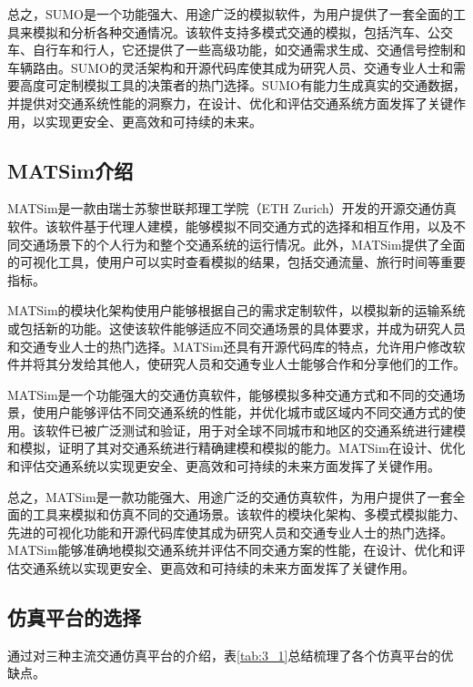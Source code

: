 总之，SUMO是一个功能强大、用途广泛的模拟软件，为用户提供了一套全面的工具来模拟和分析各种交通情况。该软件支持多模式交通的模拟，包括汽车、公交车、自行车和行人，它还提供了一些高级功能，如交通需求生成、交通信号控制和车辆路由。SUMO的灵活架构和开源代码库使其成为研究人员、交通专业人士和需要高度可定制模拟工具的决策者的热门选择。SUMO有能力生成真实的交通数据，并提供对交通系统性能的洞察力，在设计、优化和评估交通系统方面发挥了关键作用，以实现更安全、更高效和可持续的未来。

\subsection{MATSim介绍}

MATSim是一款由瑞士苏黎世联邦理工学院（ETH Zurich）开发的开源交通仿真软件。该软件基于代理人建模，能够模拟不同交通方式的选择和相互作用，以及不同交通场景下的个人行为和整个交通系统的运行情况。此外，MATSim提供了全面的可视化工具，使用户可以实时查看模拟的结果，包括交通流量、旅行时间等重要指标。

MATSim的模块化架构使用户能够根据自己的需求定制软件，以模拟新的运输系统或包括新的功能。这使该软件能够适应不同交通场景的具体要求，并成为研究人员和交通专业人士的热门选择。MATSim还具有开源代码库的特点，允许用户修改软件并将其分发给其他人，使研究人员和交通专业人士能够合作和分享他们的工作。

MATSim是一个功能强大的交通仿真软件，能够模拟多种交通方式和不同的交通场景，使用户能够评估不同交通系统的性能，并优化城市或区域内不同交通方式的使用。该软件已被广泛测试和验证，用于对全球不同城市和地区的交通系统进行建模和模拟，证明了其对交通系统进行精确建模和模拟的能力。MATSim在设计、优化和评估交通系统以实现更安全、更高效和可持续的未来方面发挥了关键作用。

总之，MATSim是一款功能强大、用途广泛的交通仿真软件，为用户提供了一套全面的工具来模拟和仿真不同的交通场景。该软件的模块化架构、多模式模拟能力、先进的可视化功能和开源代码库使其成为研究人员和交通专业人士的热门选择。MATSim能够准确地模拟交通系统并评估不同交通方案的性能，在设计、优化和评估交通系统以实现更安全、更高效和可持续的未来方面发挥了关键作用。


\subsection{仿真平台的选择}

通过对三种主流交通仿真平台的介绍，表\ref{tab:3_1}总结梳理了各个仿真平台的优缺点。

